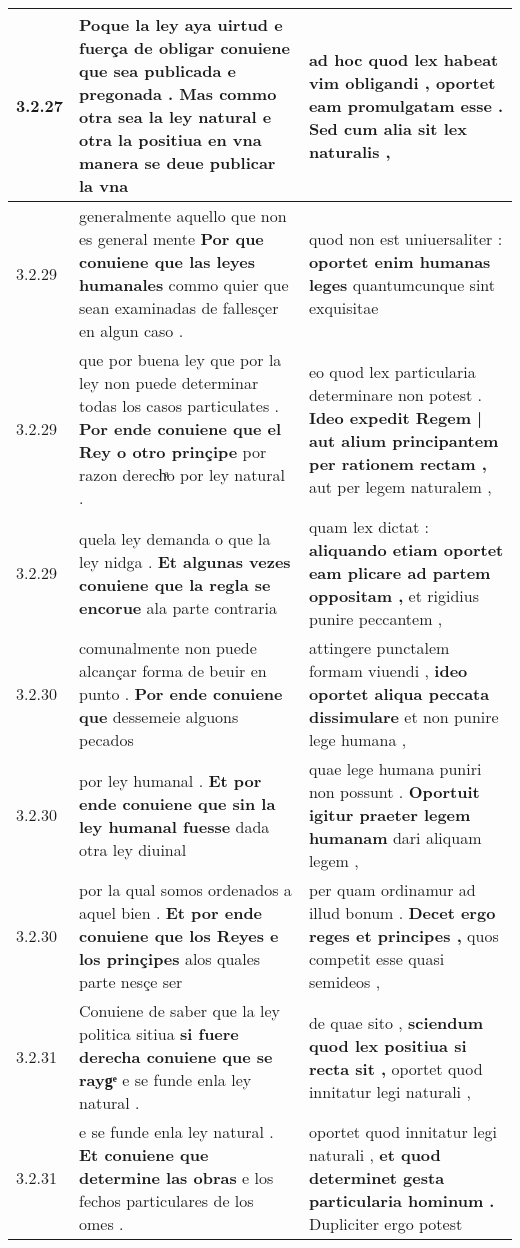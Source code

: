 \begin{tabular}{|p{1cm}|p{6.5cm}|p{6.5cm}|}
3.2.27 & Poque la ley aya uirtud e fuerça de obligar \textbf{ conuiene que sea publicada e pregonada . } Mas commo otra sea la ley natural e otra la positiua en vna manera se deue publicar la vna & ad hoc quod lex habeat vim obligandi , \textbf{ oportet eam promulgatam esse . } Sed cum alia sit lex naturalis , \\\hline
3.2.29 & generalmente aquello que non es general mente \textbf{ Por que conuiene que las leyes humanales } commo quier que sean examinadas de fallesçer en algun caso . & quod non est uniuersaliter : \textbf{ oportet enim humanas leges } quantumcunque sint exquisitae \\\hline
3.2.29 & que por buena ley que por la ley non puede determinar todas los casos particulates . \textbf{ Por ende conuiene que el Rey o otro prinçipe } por razon derechͣo por ley natural . & eo quod lex particularia determinare non potest . \textbf{ Ideo expedit Regem | aut alium principantem per rationem rectam , } aut per legem naturalem , \\\hline
3.2.29 & quela ley demanda o que la ley nidga . \textbf{ Et algunas vezes conuiene que la regla se encorue } ala parte contraria & quam lex dictat : \textbf{ aliquando etiam oportet eam plicare ad partem oppositam , } et rigidius punire peccantem , \\\hline
3.2.30 & comunalmente non puede alcançar forma de beuir en punto . \textbf{ Por ende conuiene que } dessemeie alguons pecados & attingere punctalem formam viuendi , \textbf{ ideo oportet aliqua peccata dissimulare } et non punire lege humana , \\\hline
3.2.30 & por ley humanal . \textbf{ Et por ende conuiene que sin la ley humanal fuesse } dada otra ley diuinal & quae lege humana puniri non possunt . \textbf{ Oportuit igitur praeter legem humanam } dari aliquam legem , \\\hline
3.2.30 & por la qual somos ordenados a aquel bien . \textbf{ Et por ende conuiene que los Reyes e los prinçipes } alos quales parte nesçe ser & per quam ordinamur ad illud bonum . \textbf{ Decet ergo reges et principes , } quos competit esse quasi semideos , \\\hline
3.2.31 & Conuiene de saber que la ley politica sitiua \textbf{ si fuere derecha conuiene que se raygͤ } e se funde enla ley natural . & de quae sito , \textbf{ sciendum quod lex positiua si recta sit , } oportet quod innitatur legi naturali , \\\hline
3.2.31 & e se funde enla ley natural . \textbf{ Et conuiene que determine las obras } e los fechos particulares de los omes . & oportet quod innitatur legi naturali , \textbf{ et quod determinet gesta particularia hominum . } Dupliciter ergo potest \\\hline

\end{tabular}
